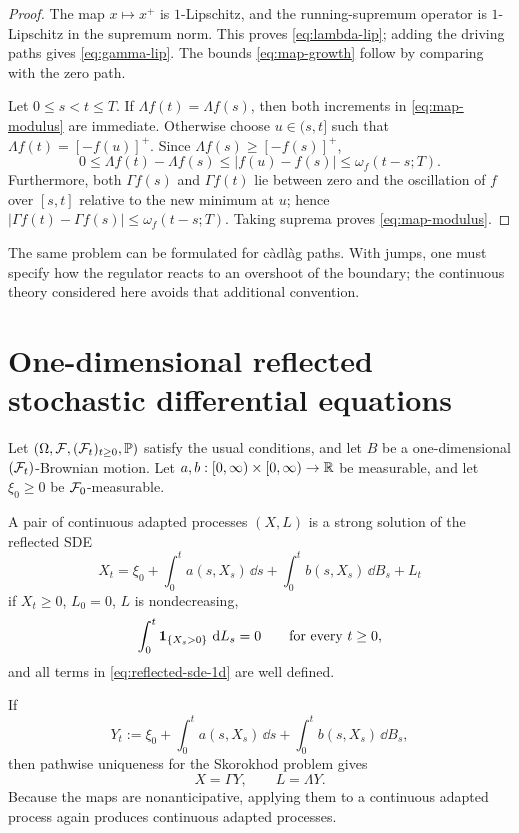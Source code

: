 \begin{proof}
The map $x\mapsto x^+$ is $1$-Lipschitz, and the running-supremum operator is
$1$-Lipschitz in the supremum norm. This proves \eqref{eq:lambda-lip}; adding
the driving paths gives \eqref{eq:gamma-lip}. The bounds
\eqref{eq:map-growth} follow by comparing with the zero path.

Let $0\leq s<t\leq T$. If $\Lambda f(t)=\Lambda f(s)$, then both increments
in \eqref{eq:map-modulus} are immediate. Otherwise choose
$u\in(s,t]$ such that $\Lambda f(t)=[-f(u)]^+$. Since
$\Lambda f(s)\geq[-f(s)]^+$,
\[
  0\leq\Lambda f(t)-\Lambda f(s)
  \leq |f(u)-f(s)|\leq\omega_f(t-s;T).
\]
Furthermore, both $\Gamma f(s)$ and $\Gamma f(t)$ lie between zero and the
oscillation of $f$ over $[s,t]$ relative to the new minimum at $u$; hence
$|\Gamma f(t)-\Gamma f(s)|\leq\omega_f(t-s;T)$. Taking suprema proves
\eqref{eq:map-modulus}.
\end{proof}

\begin{remark}
The same problem can be formulated for c\`adl\`ag paths. With jumps, one must
specify how the regulator reacts to an overshoot of the boundary; the
continuous theory considered here avoids that additional convention.
\end{remark}

\section{One-dimensional reflected stochastic differential equations}

Let $(\Omega,\mathcal F,(\mathcal F_t)_{t\geq0},\mathbb P)$ satisfy the usual conditions, and let
$B$ be a one-dimensional $(\mathcal F_t)$-Brownian motion. Let
$a,b:[0,\infty)\times[0,\infty)\to\mathbb R$ be measurable, and let
$\xi_0\geq0$ be $\mathcal F_0$-measurable.

\begin{definition}
A pair of continuous adapted processes $(X,L)$ is a strong solution of the
reflected SDE
\begin{equation}
  X_t=\xi_0+\int_0^t a(s,X_s)\,\dd s
      +\int_0^t b(s,X_s)\,\dd B_s+L_t \label{eq:reflected-sde-1d}
\end{equation}
if $X_t\geq0$, $L_0=0$, $L$ is nondecreasing,
\[
  \int_0^t\mathbf 1_{\{X_s>0\}}\,\mathop{}\!\mathrm d L_s=0
  \qquad\text{for every }t\geq0,
\]
and all terms in \eqref{eq:reflected-sde-1d} are well defined.
\end{definition}

If
\[
  Y_t:=\xi_0+\int_0^t a(s,X_s)\,\dd s
      +\int_0^t b(s,X_s)\,\dd B_s,
\]
then pathwise uniqueness for the Skorokhod problem gives
\[
  X=\Gamma Y,
  \qquad
  L=\Lambda Y.
\]
Because the maps are nonanticipative, applying them to a continuous adapted
process again produces continuous adapted processes.

